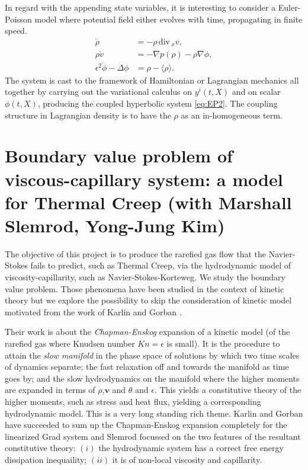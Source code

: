 \documentclass[a4paper,11pt]{article}
\def\div{\,\textrm{div}\,}
\begin{document}
In regard with the appending state variables, it is interesting to consider a Euler-Poisson model where potential field either evolves with time, propagating in finite speed.%
\begin{equation} \label{eq:EP2}
\begin{aligned}
 \dot{\rho} &= -\rho \div_x v,\\
 \rho\dot{v}&= -\nabla p(\rho) - \rho\nabla\phi,\\
 \epsilon^2\ddot\phi-\Delta \phi&= \rho-\langle\rho\rangle.
\end{aligned}
\end{equation}
The system is cast to the framework of Hamiltonian or Lagrangian mechanics all together by carrying out the variational calculus on $y^i(t,X)$ and on scalar $\phi(t,X)$, producing the coupled hyperbolic system \eqref{eq:EP2}. The coupling structure in Lagrangian density is to have the $\rho$ as an in-homogeneous term. %

\section{Boundary value problem of viscous-capillary system: a model for Thermal Creep {\small (with Marshall Slemrod, Yong-Jung Kim)}}
The objective of this project is to produce the rarefied gas flow that the Navier-Stokes fails to predict, such as Thermal Creep, via the hydrodynamic model of viscosity-capillarity, such as Navier-Stokes-Korteweg. We study the boundary value problem. Those phenomena have been studied in the context of kinetic theory but we explore the possibility to skip the consideration of kinetic model motivated from the work of Karlin and Gorban \cite{GK}.

Their work is about the {\it Chapman-Enskog} expansion of a kinetic model (of the rarefied gas where Knudsen number $Kn=\epsilon$ is small). It is the procedure to attain the {\it slow manifold} in the phase space of solutions by which two time scales of dynamics separate; the fast relaxation off and towards the manifold as time goes by; and the slow hydrodynamics on the manifold where the higher moments are expanded in terms of $\rho$,$\mathbf{v}$ and $\theta$ and $\epsilon$. This yields a constitutive theory of the higher moments, such as stress and heat flux, yielding a corresponding hydrodynamic model. This is a very long standing rich theme. Karlin and Gorban have succeeded to sum up the {Chapman-Enskog} expansion completely for the linearized Grad system and
Slemrod focussed on the two features of the resultant constitutive theory: $(i)$ the hydrodynamic system has a correct free energy dissipation inequaility; $(ii)$ it is of non-local viscosity and capillarity.
\end{document}
